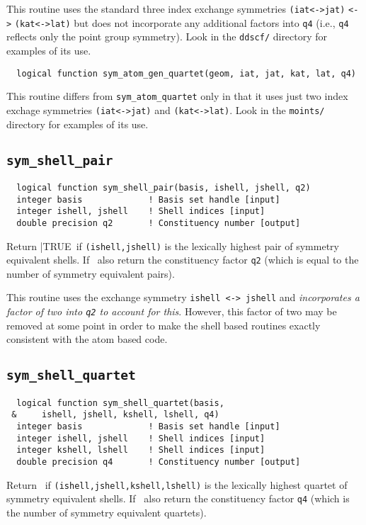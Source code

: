 This routine uses the standard three index exchange symmetries
\verb+(iat<->jat)+ \verb+<->+ \verb+(kat<->lat)+ but does not
incorporate any additional factors into \verb+q4+ (i.e., \verb+q4+
reflects only the point group symmetry).  Look in the \verb+ddscf/+
directory for examples of its use.

\begin{verbatim}
  logical function sym_atom_gen_quartet(geom, iat, jat, kat, lat, q4)
\end{verbatim}
This routine differs from \verb+sym_atom_quartet+ only in that it
uses just two index exchage symmetries \verb+(iat<->jat)+ and
\verb+(kat<->lat)+.  Look in the \verb+moints/+ directory for examples
of its use.

\subsection{{\tt sym\_shell\_pair}}
\begin{verbatim}
  logical function sym_shell_pair(basis, ishell, jshell, q2)
  integer basis             ! Basis set handle [input]
  integer ishell, jshell    ! Shell indices [input]
  double precision q2       ! Constituency number [output]
\end{verbatim}
Return |TRUE\ if \verb+(ishell,jshell)+ is the lexically highest pair
of symmetry equivalent shells. If \TRUE\, also return the constituency
factor \verb+q2+ (which is equal to the number of symmetry equivalent
pairs).

This routine uses the exchange symmetry \verb+ishell <-> jshell+ and
{\em incorporates a factor of two into \verb+q2+ to account for this}.
However, this factor of two may be removed at some point in order to
make the shell based routines exactly consistent with the atom based
code.

\subsection{{\tt sym\_shell\_quartet}}
\begin{verbatim}
  logical function sym_shell_quartet(basis,
 &     ishell, jshell, kshell, lshell, q4)
  integer basis             ! Basis set handle [input]
  integer ishell, jshell    ! Shell indices [input]
  integer kshell, lshell    ! Shell indices [input]
  double precision q4       ! Constituency number [output]
\end{verbatim}
Return \TRUE\ if \verb+(ishell,jshell,kshell,lshell)+ is the lexically highest
quartet of symmetry equivalent shells. If \TRUE\ also return the
constituency factor \verb+q4+ (which is the number of symmetry
equivalent quartets).

